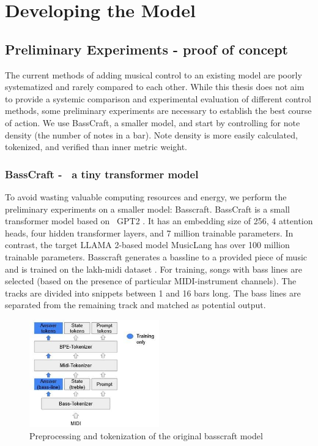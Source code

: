 \section{Developing the Model}

\subsection{Preliminary Experiments - proof of concept}
The current methods of adding musical control to an existing model are poorly systematized and rarely compared to each other. While this thesis does not aim to provide a systemic comparison and experimental evaluation of different control methods, some preliminary experiments are necessary to establish the best course of action. We use BassCraft, a smaller model, and start by controlling for note density (the number of notes in a bar). Note density is more easily calculated, tokenized, and verified than inner metric weight.  

\subsubsection{BassCraft -  a tiny transformer model}
To avoid wasting valuable computing resources and energy, we perform the preliminary experiments on a smaller model: Basscraft. BassCraft is a small transformer model based on  GPT2 \cite{Radford_Wu_Child_Luan_gpt2_2019}. It has an embedding size of 256, 4 attention heads, four hidden transformer layers, and 7 million trainable parameters. In contrast, the target LLAMA 2-based model MusicLang has over 100 million trainable parameters. Basscraft generates a bassline to a provided piece of music and is trained on the lakh-midi dataset \cite{Raffel_2016}. For training, songs with bass lines are selected (based on the presence of particular MIDI-instrument channels). The tracks are divided into snippets between 1 and 16 bars long. The bass lines are separated from the remaining track and matched as potential output. 

\begin{figure}[H]
    \centering
    \includegraphics[width=0.5\textwidth]{IMAGES/Preprocessing1.jpg} 
    \caption{Preprocessing and tokenization of the original basscraft model}
    \label{fig:preprocessing1}
\end{figure}

